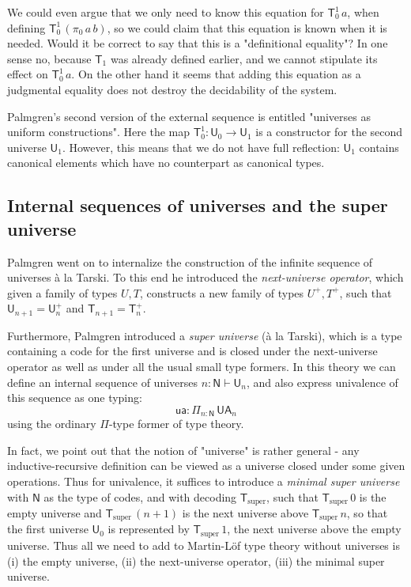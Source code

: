 \documentclass[11pt,a4paper]{article}
\def\NN{\mathsf{N}}
\def\UU{\mathsf{U}}
\newcommand{\N}{\mathsf{N}}
\newcommand{\T}{\mathsf{T}}
\newcommand{\Tsuper}{\T_{\mathrm{super}}}
\newcommand{\ua}{\mathsf{ua}}
\newcommand{\UA}{\mathsf{UA}}
\begin{document}
We could even argue that we only need to know this equation for $\T_0^1\, a$, when defining $\T_0^1\, (\pi_0\,a\, b)$, so we could claim that this equation is known when it is needed. Would it be correct to say that this is a "definitional equality"? In one sense no, because $\T_1$ was already defined earlier, and we cannot stipulate its effect on $\T_0^1\, a$. On the other hand it seems that adding this equation as a judgmental equality does not destroy the decidability of the system.

Palmgren's second version of the external sequence is entitled "universes as uniform constructions". Here the map $\T_0^1 : \UU_0 \to \UU_1$ is a constructor for the second universe $\UU_1$. However, this means that we do not have full reflection: $\UU_1$ contains canonical elements which have no counterpart as canonical types.

\subsection{Internal sequences of universes and the super universe}

Palmgren \cite{palmgren:venice} went on to internalize the construction of the infinite sequence of universes  \`a la Tarski. To this end he introduced the {\em next-universe operator}, which given a family of types $U, T$, constructs a new family of types $U^+, T^+$, such that $ \UU_{n+1} = \UU_n^+$ and $\T_{n+1} = \T_n^+$.

Furthermore, Palmgren introduced a {\em super universe} (\`a la Tarski), which is a type containing a code for the first universe and is closed under the next-universe operator as well as under all the usual small type formers. In this theory we can define an internal sequence of universes $n : \NN \vdash \UU_n$, and also express univalence of this sequence as one typing:
$$
\ua : \Pi_{n : \N}\, \UA_n
$$
using the ordinary $\Pi$-type former of type theory.

In fact, we point out that the notion of "universe" is rather general - any inductive-recursive definition can be viewed as a universe closed under some given operations. Thus for univalence, it suffices to introduce a {\em minimal super universe} with $\N$ as the type of codes, and with decoding $\Tsuper$,
such that $\Tsuper\,0$ is the empty universe and $\Tsuper\,(n + 1)$ is the next universe above $\Tsuper\,n$, so that the first universe $\UU_0$ is represented by $\Tsuper\,1$, the next universe above the empty universe. Thus all we need to add to Martin-Löf type theory without universes is (i) the empty universe, (ii) the next-universe operator, (iii) the minimal super universe.
\end{document}
